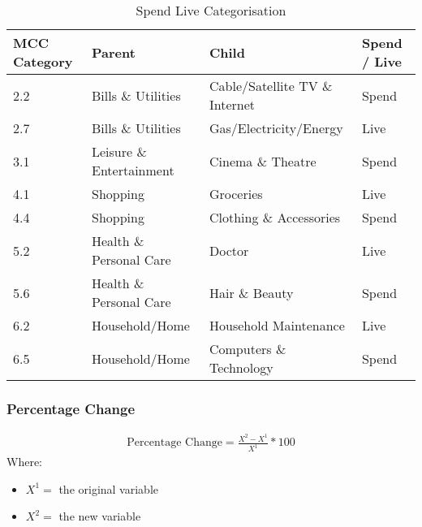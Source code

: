 \begin{table}[H]
	\centering
	\resizebox{\textwidth}{!}
	{
	\label{my-label}
	\begin{tabular}{|l|l|l|l|}
		\hline
		\textbf{MCC Category} & \textbf{Parent}          & \textbf{Child}                 & \textbf{Spend / Live} \\ \hline
		2.2                   & Bills \& Utilities       & Cable/Satellite TV \& Internet & Spend                 \\ \hline
		2.7                   & Bills \& Utilities       & Gas/Electricity/Energy         & Live                  \\ \hline
		3.1                   & Leisure \& Entertainment & Cinema \& Theatre              & Spend                 \\ \hline
		4.1                   & Shopping                 & Groceries                     & Live                  \\ \hline
		4.4                   & Shopping                 & Clothing \& Accessories        & Spend                 \\ \hline
		5.2                   & Health \& Personal Care  & Doctor                         & Live                  \\ \hline
		5.6                   & Health \& Personal Care  & Hair \& Beauty                 & Spend                 \\ \hline
		6.2                   & Household/Home           & Household Maintenance          & Live                  \\ \hline
		6.5                   & Household/Home           & Computers \& Technology        & Spend                 \\ \hline
	\end{tabular}
	}
	\caption{Spend Live Categorisation }
\end{table}



\subsubsection{Percentage Change}

\begin{align}
\text{Percentage Change} = \frac{X^{2} - X^{1}}{X^{1}}*100  
\end{align}
Where: 
\vspace{-7mm} 
\begin{itemize}
	\item $X^{1} = $ the original variable
	\item $X^{2} = $ the new variable
\end{itemize}



